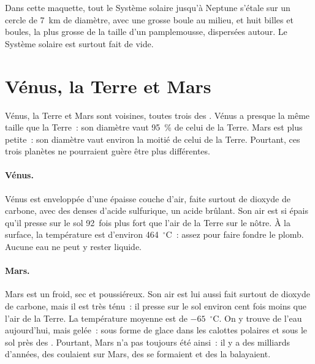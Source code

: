 Dans cette maquette, tout le Système solaire jusqu'à Neptune s'étale sur un
cercle de 7~km de diamètre, avec une grosse boule au milieu, et huit billes
et boules, la plus grosse de la taille d'un pamplemousse, dispersées
autour. Le Système solaire est surtout fait de vide.

\section{Vénus, la Terre et Mars}

Vénus, la Terre et Mars sont voisines, toutes trois des .
Vénus a presque la même taille que la Terre~: son diamètre vaut 95~\% de
celui de la Terre. Mars est plus petite~: son diamètre vaut environ la
moitié de celui de la Terre. Pourtant, ces trois planètes ne pourraient
guère être plus différentes.

\paragraph{Vénus.} Vénus est enveloppée d'une épaisse couche d'air, faite
surtout de dioxyde de carbone, avec des  denses d'acide sulfurique,
un acide brûlant. Son air est si épais qu'il presse sur le sol 92~fois plus
fort que l'air de la Terre sur le nôtre. À la surface, la température est
d'environ 464~$^\circ$C~: assez pour faire fondre le plomb. Aucune eau ne
peut y rester liquide.

\paragraph{Mars.} Mars est un  froid, sec et poussiéreux. Son air est
lui aussi fait surtout de dioxyde de carbone, mais il est très ténu~: il
presse sur le sol environ cent fois moins que l'air de la Terre. La
température moyenne est de $-65$~$^\circ$C. On y trouve de l'eau
aujourd'hui, mais gelée~: sous forme de glace dans les calottes polaires et
sous le sol près des . Pourtant, Mars n'a pas toujours été ainsi~: il
y a des milliards d'années, des  coulaient sur Mars, des  se
formaient et des  la balayaient.

